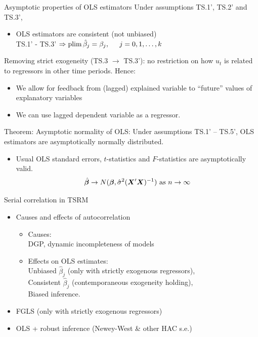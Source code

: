 \documentclass{beamer}
\begin{document}
\begin{frame}{Asymptotic properties of OLS estimators}
Under assumptions TS.1', TS.2' and TS.3', \\ \medskip
\begin{itemize}
\item OLS estimators are consistent (not unbiased)\\ 
\medskip
TS.1' - TS.3' $\Rightarrow \textnormal{plim}\,\hat{\beta}_j = \beta_j, \hspace{0.5cm} j=0, 1, \dots, k$
\end{itemize} \bigskip
Removing strict exogeneity (TS.3 $\rightarrow$ TS.3'): no restriction on how $u_t$ is related to regressors in other time periods. Hence: \\
\medskip
\begin{itemize}
\item We allow for feedback from (lagged) explained variable to ``future'' values of explanatory variables 
\medskip
\item We can use lagged dependent variable as a regressor.
\end{itemize} \medskip
Theorem: Asymptotic normality of OLS: Under assumptions TS.1' – TS.5', OLS estimators are asymptotically normally distributed. \medskip
\begin{itemize}
\item Usual OLS standard errors, $t$-statistics and $F$-statistics are asymptotically valid.
$$
\hat{\bm{\beta}} \rightarrow N(\bm{\beta}, \hat{\sigma}^2(\bm{X}^{\prime} \bm{X})^{-1} )
\textnormal{~as~} n \rightarrow \infty
$$
\end{itemize}
\end{frame}
\begin{frame}{Serial correlation in TSRM}
\begin{itemize}
\item Causes and effects of autocorrelation \\ \bigskip 
 \begin{itemize}
     \item Causes:  \\ \smallskip DGP, dynamic incompleteness of models
     \bigskip
     \item Effects on OLS estimates: \\\smallskip Unbiased $\hat{\beta}_j$ (only with strictly exogenous regressors), \\ \smallskip Consistent $\hat{\beta}_j$ (contemporaneous exogeneity holding), \\ \smallskip Biased inference.
 \end{itemize}
\bigskip
\item FGLS (only with strictly exogenous regressors)
\bigskip
\item OLS + robust inference (Newey-West \& other HAC s.e.)
\end{itemize}
\end{frame}
\end{document}
